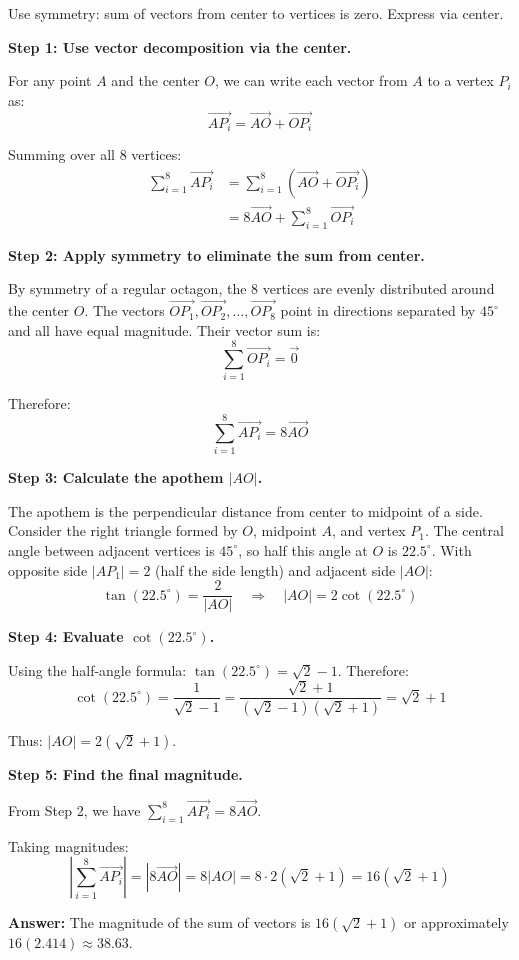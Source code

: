 \begin{hint}
Use symmetry: sum of vectors from center to vertices is zero. Express via center.
\end{hint}

\begin{solution}
\textbf{Step 1: Use vector decomposition via the center.}

For any point $A$ and the center $O$, we can write each vector from $A$ to a vertex $P_i$ as:
$$\overrightarrow{AP_i} = \overrightarrow{AO} + \overrightarrow{OP_i}$$

Summing over all 8 vertices:
\begin{align*}
\sum_{i=1}^{8} \overrightarrow{AP_i} &= \sum_{i=1}^{8} (\overrightarrow{AO} + \overrightarrow{OP_i}) \\
&= 8\overrightarrow{AO} + \sum_{i=1}^{8} \overrightarrow{OP_i}
\end{align*}

\textbf{Step 2: Apply symmetry to eliminate the sum from center.}

By symmetry of a regular octagon, the 8 vertices are evenly distributed around the center $O$. The vectors $\overrightarrow{OP_1}, \overrightarrow{OP_2}, \ldots, \overrightarrow{OP_8}$ point in directions separated by $45^\circ$ and all have equal magnitude. Their vector sum is:
$$\sum_{i=1}^{8} \overrightarrow{OP_i} = \vec{0}$$

Therefore:
$$\sum_{i=1}^{8} \overrightarrow{AP_i} = 8\overrightarrow{AO}$$

\textbf{Step 3: Calculate the apothem $|AO|$.}

The apothem is the perpendicular distance from center to midpoint of a side. Consider the right triangle formed by $O$, midpoint $A$, and vertex $P_1$. The central angle between adjacent vertices is $45^\circ$, so half this angle at $O$ is $22.5^\circ$. With opposite side $|AP_1| = 2$ (half the side length) and adjacent side $|AO|$:
$$\tan(22.5^\circ) = \frac{2}{|AO|} \quad \Rightarrow \quad |AO| = 2\cot(22.5^\circ)$$

\textbf{Step 4: Evaluate $\cot(22.5^\circ)$.}

Using the half-angle formula: $\tan(22.5^\circ) = \sqrt{2} - 1$. Therefore:
$$\cot(22.5^\circ) = \frac{1}{\sqrt{2} - 1} = \frac{\sqrt{2} + 1}{(\sqrt{2} - 1)(\sqrt{2} + 1)} = \sqrt{2} + 1$$

Thus: $|AO| = 2(\sqrt{2} + 1)$.

\textbf{Step 5: Find the final magnitude.}

From Step 2, we have $\sum_{i=1}^{8} \overrightarrow{AP_i} = 8\overrightarrow{AO}$.

Taking magnitudes:
$$\left|\sum_{i=1}^{8} \overrightarrow{AP_i}\right| = |8\overrightarrow{AO}| = 8|AO| = 8 \cdot 2(\sqrt{2} + 1) = 16(\sqrt{2} + 1)$$

\textbf{Answer:} The magnitude of the sum of vectors is $\boxed{16(\sqrt{2} + 1)}$ or approximately $\boxed{16(2.414) \approx 38.63}$.
\end{solution}



\vspace{1em}
